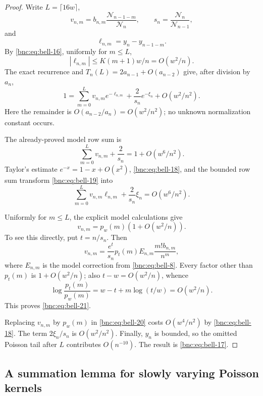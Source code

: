 \documentclass[11pt]{article}
\numberwithin{equation}{section}
\theoremstyle{definition}
\theoremstyle{remark}
\begin{document}
\begin{proof}
Write \(L=\lceil16w\rceil\),
\[
 v_{n,m}=b_{n,m}\frac{\mathcal N_{n-1-m}}{\mathcal N_n},
 \qquad s_n=\frac{\mathcal N_n}{\mathcal N_{n-1}},
\]
and
\[
 \ell_{n,m}=y_n-y_{n-1-m}.
\]
By \eqref{bnc:eq:bell-16}, uniformly for \(m\le L\),
\begin{equation}\label{bnc:eq:bell-18}
|\ell_{n,m}|
 \le K(m+1)w/n=O(w^2/n).
\end{equation}
The exact recurrence and
\(T_n(L)=2a_{n-1}+O(a_{n-2})\)
give, after division by \(a_n\),
\begin{equation}\label{bnc:eq:bell-19}
1=\sum_{m=0}^{L}v_{n,m}e^{-\ell_{n,m}}
       +\frac2{s_n}e^{-\xi_n}+O(w^2/n^2).
\end{equation}
Here the remainder is \(O(a_{n-2}/a_n)=O(w^2/n^2)\);
no unknown normalization constant occurs.

The already-proved model row sum is
\[
 \sum_{m=0}^{L}v_{n,m}+\frac2{s_n}
 =1+O(w^6/n^2).
\]
Taylor's estimate \(e^{-x}=1-x+O(x^2)\), \eqref{bnc:eq:bell-18}, and the bounded
row sum transform \eqref{bnc:eq:bell-19} into
\begin{equation}\label{bnc:eq:bell-20}
\sum_{m=0}^{L}v_{n,m}\ell_{n,m}
       +\frac2{s_n}\xi_n
 =O(w^6/n^2).
\end{equation}

Uniformly for \(m\le L\), the explicit model calculations give
\begin{equation}\label{bnc:eq:bell-21}
v_{n,m}=p_w(m)\left(1+O(w^2/n)\right).
\end{equation}
To see this directly, put \(t=n/s_n\).
Then
\[
 v_{n,m}
 =\frac{e^t}{s_n}p_t(m)
   E_{n,m}\frac{m!b_{n,m}}{n^m},
\]
where \(E_{n,m}\) is the model correction from \eqref{bnc:eq:bell-8}.
Every factor other than \(p_t(m)\) is \(1+O(w^2/n)\);
also \(t-w=O(w^2/n)\), whence
\[
 \log\frac{p_t(m)}{p_w(m)}
 =w-t+m\log(t/w)=O(w^2/n).
\]
This proves \eqref{bnc:eq:bell-21}.

Replacing \(v_{n,m}\) by \(p_w(m)\) in \eqref{bnc:eq:bell-20} costs
\(O(w^4/n^2)\) by \eqref{bnc:eq:bell-18}.
The term \(2\xi_n/s_n\) is \(O(w^2/n^2)\).
Finally, \(y_n\) is bounded, so the omitted Poisson tail after
\(L\) contributes \(O(n^{-10})\).
The result is \eqref{bnc:eq:bell-17}.
\end{proof}

\subsection{A summation lemma for slowly varying Poisson kernels}
\end{document}
